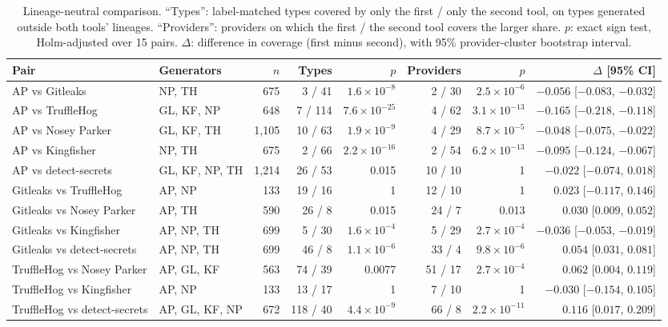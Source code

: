 \documentclass[10pt,journal,compsoc]{IEEEtran}
\begin{document}
\begin{table}[t]
\centering
\caption{Lineage-neutral comparison. ``Types'': label-matched types covered by only the first / only the second tool, on types generated outside both tools' lineages. ``Providers'': providers on which the first / the second tool covers the larger share. $p$: exact sign test, Holm-adjusted over 15 pairs. $\Delta$: difference in coverage (first minus second), with 95\% provider-cluster bootstrap interval.}
\label{tab:neutral}
\footnotesize
\setlength{\tabcolsep}{4pt}
\begin{tabular}{@{}llrrrrrr@{}}
\toprule
Pair & Generators & $n$ & Types & $p$ & Providers & $p$ & $\Delta$ [95\% CI] \\
\midrule
AP vs Gitleaks & NP, TH & 675 & 3 / 41 & $1.6\times10^{-8}$ & 2 / 30 & $2.5\times10^{-6}$ & $-0.056$ [$-0.083$, $-0.032$] \\
AP vs TruffleHog & GL, KF, NP & 648 & 7 / 114 & $7.6\times10^{-25}$ & 4 / 62 & $3.1\times10^{-13}$ & $-0.165$ [$-0.218$, $-0.118$] \\
AP vs Nosey Parker & GL, KF, TH & 1{,}105 & 10 / 63 & $1.9\times10^{-9}$ & 4 / 29 & $8.7\times10^{-5}$ & $-0.048$ [$-0.075$, $-0.022$] \\
AP vs Kingfisher & NP, TH & 675 & 2 / 66 & $2.2\times10^{-16}$ & 2 / 54 & $6.2\times10^{-13}$ & $-0.095$ [$-0.124$, $-0.067$] \\
AP vs detect-secrets & GL, KF, NP, TH & 1{,}214 & 26 / 53 & 0.015 & 10 / 10 & 1 & $-0.022$ [$-0.074$, $0.018$] \\
Gitleaks vs TruffleHog & AP, NP & 133 & 19 / 16 & 1 & 12 / 10 & 1 & $0.023$ [$-0.117$, $0.146$] \\
Gitleaks vs Nosey Parker & AP, TH & 590 & 26 / 8 & 0.015 & 24 / 7 & 0.013 & $0.030$ [$0.009$, $0.052$] \\
Gitleaks vs Kingfisher & AP, NP, TH & 699 & 5 / 30 & $1.6\times10^{-4}$ & 5 / 29 & $2.7\times10^{-4}$ & $-0.036$ [$-0.053$, $-0.019$] \\
Gitleaks vs detect-secrets & AP, NP, TH & 699 & 46 / 8 & $1.1\times10^{-6}$ & 33 / 4 & $9.8\times10^{-6}$ & $0.054$ [$0.031$, $0.081$] \\
TruffleHog vs Nosey Parker & AP, GL, KF & 563 & 74 / 39 & 0.0077 & 51 / 17 & $2.7\times10^{-4}$ & $0.062$ [$0.004$, $0.119$] \\
TruffleHog vs Kingfisher & AP, NP & 133 & 13 / 17 & 1 & 7 / 10 & 1 & $-0.030$ [$-0.154$, $0.105$] \\
TruffleHog vs detect-secrets & AP, GL, KF, NP & 672 & 118 / 40 & $4.4\times10^{-9}$ & 66 / 8 & $2.2\times10^{-11}$ & $0.116$ [$0.017$, $0.209$] \\

\end{tabular}
\end{table}
\end{document}
